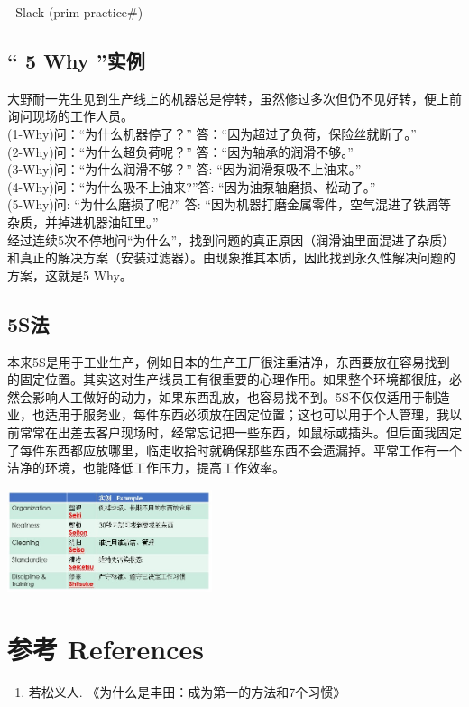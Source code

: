 \begin{description}
\tightlist
\item[]
- Slack (prim practice\#)
\end{description}

\hypertarget{why-ux5b9eux4f8b}{%
\subsection{`` 5 Why ''实例}\label{why-ux5b9eux4f8b}}

大野耐一先生见到生产线上的机器总是停转，虽然修过多次但仍不见好转，便上前询问现场的工作人员。\\
(1-Why)问：``为什么机器停了？'' 答：``因为超过了负荷，保险丝就断了。''\\
(2-Why)问：``为什么超负荷呢？'' 答：``因为轴承的润滑不够。''\\
(3-Why)问：``为什么润滑不够？'' 答: ``因为润滑泵吸不上油来。''\\
(4-Why)问：``为什么吸不上油来?''答: ``因为油泵轴磨损、松动了。''\\
(5-Why)问: ``为什么磨损了呢?'' 答:
``因为机器打磨金属零件，空气混进了铁屑等杂质，并掉进机器油缸里。''\\
经过连续5次不停地问``为什么''，找到问题的真正原因（润滑油里面混进了杂质）和真正的解决方案（安装过滤器）。由现象推其本质，因此找到永久性解决问题的方案，这就是5
Why。

\hypertarget{sux6cd5}{%
\subsection{5S法}\label{sux6cd5}}

本来5S是用于工业生产，例如日本的生产工厂很注重洁净，东西要放在容易找到的固定位置。其实这对生产线员工有很重要的心理作用。如果整个环境都很脏，必然会影响人工做好的动力，如果东西乱放，也容易找不到。5S不仅仅适用于制造业，也适用于服务业，每件东西必须放在固定位置；这也可以用于个人管理，我以前常常在出差去客户现场时，经常忘记把一些东西，如鼠标或插头。但后面我固定了每件东西都应放哪里，临走收拾时就确保那些东西不会遗漏掉。平常工作有一个洁净的环境，也能降低工作压力，提高工作效率。


\includegraphics[width=6cm]{5S_五常法_Screenshot_2023-08-03_211606.jpg}\\

\hypertarget{ux53c2ux8003-references}{%
\section{参考 References}\label{ux53c2ux8003-references}}

\begin{enumerate}
\tightlist
\item
  若松义人. 《为什么是丰田：成为第一的方法和7个习惯》
\end{enumerate}


